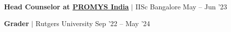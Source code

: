 \resumeProjectHeading
{\textbf{Head Counselor at \href{https://promys-india.org}{PROMYS India}} $|$ IISc Bangalore}
{May -- Jun '23}
\vspace{-20pt}

\resumeProjectHeading
{\textbf{Grader} $|$ Rutgers University}
{Sep '22 -- May '24}
\vspace{-20pt}



